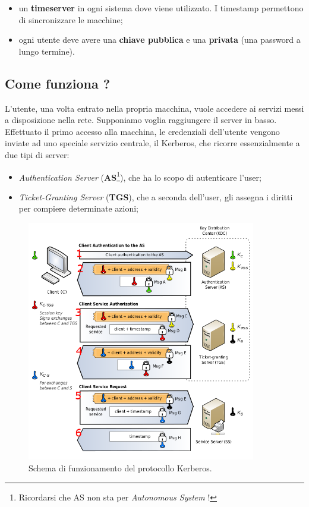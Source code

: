 \begin{itemize}
      \item un \textbf{timeserver} in ogni sistema dove viene utilizzato.
            I timestamp permettono di sincronizzare le macchine;
      \item ogni utente deve avere una \textbf{chiave pubblica} e una \textbf{privata}
            (una password a lungo termine).

\end{itemize}

\subsection{Come funziona ?}

L’utente, una volta entrato nella propria macchina, vuole accedere ai servizi
messi a disposizione nella rete. Supponiamo voglia raggiungere il server in basso.
Effettuato il primo accesso alla macchina, le credenziali dell’utente vengono
inviate ad uno speciale servizio centrale, il Kerberos, che ricorre essenzialmente
a due tipi di server:

\begin{itemize}
      \item \textit{Authentication Server} (\textbf{AS}\footnote{Ricordarsi che
                  AS non sta per
                  \textit{Autonomous System} !}),
            che ha lo scopo di autenticare l’user;
      \item \textit{Ticket-Granting Server} (\textbf{TGS}), che a seconda dell’user,
            gli assegna i diritti per compiere determinate azioni;
\end{itemize}

\begin{figure}[H]
      \centering
      \includegraphics[width=10cm, keepaspectratio]{capitoli/autenticazione/imgs/kerberos1.png}
      \caption{Schema di funzionamento del protocollo Kerberos.}
\end{figure}

